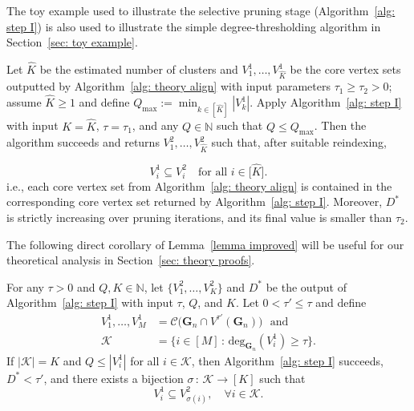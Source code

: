 \documentclass[twoside,11pt]{article}
\theoremstyle{remark}
\begin{document}
The toy example used to illustrate the selective pruning stage (Algorithm~\ref{alg: step I}) is also used to illustrate the simple degree-thresholding algorithm in Section~\ref{sec: toy example}.



\begin{lemma}
\label{lemma improved}  
Let $\hat{K}$ be the estimated number of clusters and $V^1_1, \ldots, V^1_{\hat{K}}$ be the core vertex sets outputted by Algorithm~\ref{alg: theory align} with input parameters $\tau_1\geq\tau_2>0$; assume $\hat K\geq1$ and define $Q_{\max} := \min_{k \in [\hat{K}]} |V^1_k|$. 
Apply Algorithm~\ref{alg: step I} with input $K=\hat K$, $\tau=\tau_1$, and any $Q\in\mathbb N$ such that $Q\leq Q_{\max}$. Then the algorithm succeeds and returns $V_1^2,\ldots,V_{\hat K}^2$ such that, after suitable reindexing,

%
\begin{equation*}
    V^1_i \subseteq V^2_i  \quad \text{for all $i\in \bigl[ \hat{K} \bigr]$}.
\end{equation*}
%
i.e., each core vertex set from Algorithm~\ref{alg: theory align} is contained in the corresponding core vertex set returned by Algorithm~\ref{alg: step I}. 
Moreover, $D^*$ is strictly increasing over pruning iterations, and its final value is smaller than $\tau_2$.
\end{lemma}

The following direct corollary of Lemma~\ref{lemma improved} will be useful for our theoretical analysis in Section~\ref{sec: theory proofs}. 

\begin{corollary}
\label{cor: simple containment}
For any $\tau> 0$ and $Q, K \in \mathbb{N}$, let $\{V_1^2, \ldots, V_K^2\}$ and $D^*$ be the output of Algorithm~\ref{alg: step I} with input $\tau$, $Q$, and $K$. Let $0 < \tau' \leq \tau$ and define
\begin{align*}
V_1^1, \ldots, V_M^1 &= \mathcal{C}\bigl( \bm{G}_n \cap V^{\tau'}(\bm{G}_n) \bigr) \,\, \text{ and} \\
\mathcal{K} &= \biggl\{ i \in [M] \,:\, \mathrm{deg}_{\bm{G}_n}(V_i^1) \geq \tau \biggr\}.
\end{align*}
If $|\mathcal{K}| = K$ and $Q \leq |V_i^1|$ for all $i \in \mathcal{K}$, then Algorithm~\ref{alg: step I} succeeds, $D^*<\tau'$, and there exists a bijection $\sigma \,:\, \mathcal{K} \rightarrow [K]$ such that
\[
V_i^1 \subseteq V_{\sigma(i)}^2, \quad \forall i \in \mathcal{K}.
\]

\end{corollary}
\end{document}
